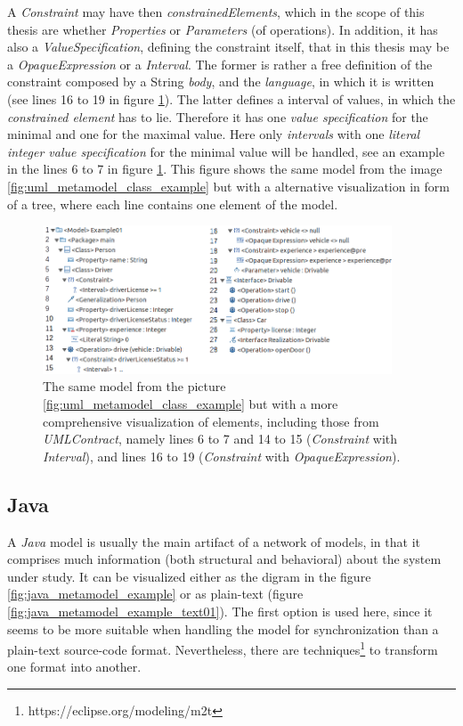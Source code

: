 \documentclass[tuberlin,cic,tc,english,noabntcite]{iiufrgs}
\begin{document}
A \emph{Constraint} may have then \emph{constrainedElements}, which in the scope of this thesis are whether \emph{Properties} or \emph{Parameters} (of operations). In addition, it has also a \emph{ValueSpecification}, defining the constraint itself, that in this thesis may be a \emph{OpaqueExpression} or a \emph{Interval}. The former is rather a free definition of the constraint composed by a String \emph{body}, and the \emph{language}, in which it is written (see lines 16 to 19 in figure \ref{fig:uml_metamodel_contracts_example}). The latter defines a interval of values, in which the \emph{constrained element} has to lie. Therefore it has one \emph{value specification} for the minimal and one for the maximal value. Here only \emph{intervals} with one \emph{literal integer value specification} for the minimal value will be handled, see an example in the lines 6 to 7 in figure \ref{fig:uml_metamodel_contracts_example}. This figure shows the same model from the image \ref{fig:uml_metamodel_class_example} but with a alternative visualization in form of a tree, where each line contains one element of the model.

\begin{figure}[h]
    \caption{The same model from the picture \ref{fig:uml_metamodel_class_example} but with a more comprehensive visualization of elements, including those from \emph{UMLContract}, namely lines 6 to 7 and 14 to 15 (\emph{Constraint} with \emph{Interval}), and lines 16 to 19 (\emph{Constraint} with \emph{OpaqueExpression}).}
    \begin{center}
        \includegraphics[width=28em]{umlContractDiagramExample01}
    \end{center}
    \label{fig:uml_metamodel_contracts_example}
\end{figure}

\subsection{Java}
A \emph{Java} model is usually the main artifact of a network of models, in that it comprises much information (both structural and behavioral) about the system under study. It can be visualized either as the digram in the figure \ref{fig:java_metamodel_example} or as plain-text (figure \ref{fig:java_metamodel_example_text01}). The first option is used here, since it seems to be more suitable when handling the model for synchronization than a plain-text source-code format. Nevertheless, there are techniques\footnote{https://eclipse.org/modeling/m2t} to transform one format into another.
\end{document}
